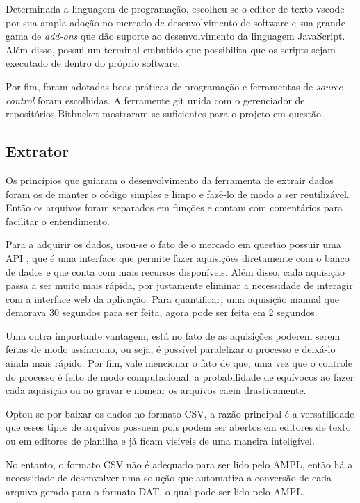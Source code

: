 Determinada a linguagem de programação, escolheu-se o editor de texto vscode por sua ampla adoção no mercado de desenvolvimento de software e sua grande gama de \textit{add-ons} que dão suporte ao desenvolvimento da linguagem JavaScript. Além disso, possui um terminal embutido que possibilita que os scripts sejam executado de dentro do próprio software.

Por fim, foram adotadas boas práticas de programação e ferramentas de \textit{source-control} foram escolhidas. A ferramente git unida com o gerenciador de repositórios Bitbucket mostraram-se suficientes para o projeto em questão.

\subsection{Extrator}
Os princípios que guiaram o desenvolvimento da ferramenta de extrair dados foram os de manter o código simples e limpo e fazê-lo de modo a ser reutilizável. Então os arquivos foram separados em funções e contam com comentários para facilitar o entendimento.

Para a adquirir os dados, usou-se o fato de o mercado em questão possuir uma \ac{API} \cite{api2019pjm}, que é uma interface que permite fazer aquisições diretamente com o banco de dados e que conta com mais recursos disponíveis. Além disso, cada aquisição passa a ser muito mais rápida, por justamente eliminar a necessidade de interagir com a interface web da aplicação. Para quantificar, uma aquisição manual que demorava 30 segundos para ser feita, agora pode ser feita em 2 segundos. 

Uma outra importante vantagem, está no fato de as aquisições poderem serem feitas de modo assíncrono, ou seja, é possível paralelizar o processo e deixá-lo ainda mais rápido. Por fim, vale mencionar o fato de que, uma vez que o controle do processo é feito de modo computacional, a probabilidade de equívocos ao fazer cada aquisição ou ao gravar e nomear os arquivos caem drasticamente.

Optou-se por baixar os dados no formato CSV, a razão principal é a versatilidade que esses tipos de arquivos possuem pois podem ser abertos em editores de texto ou em editores de planilha e já ficam visíveis de uma maneira inteligível.

No entanto, o formato CSV não é adequado para ser lido pelo AMPL, então há a necessidade de desenvolver uma solução que automatiza a conversão de cada arquivo gerado para o formato DAT, o qual pode ser lido pelo AMPL.

